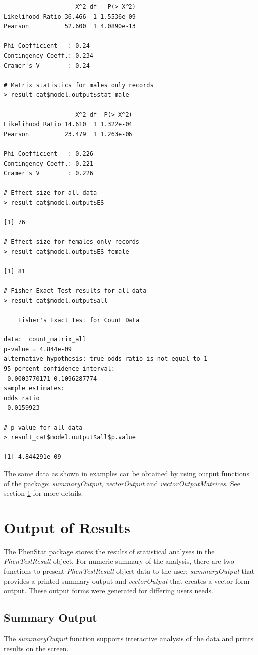 \documentclass[12pt,a4paper]{article}
\begin{document}
\begin{verbatim}
                    X^2 df   P(> X^2)
Likelihood Ratio 36.466  1 1.5536e-09
Pearson          52.600  1 4.0890e-13

Phi-Coefficient   : 0.24 
Contingency Coeff.: 0.234 
Cramer's V        : 0.24 

# Matrix statistics for males only records
> result_cat$model.output$stat_male

                    X^2 df  P(> X^2)
Likelihood Ratio 14.610  1 1.322e-04
Pearson          23.479  1 1.263e-06

Phi-Coefficient   : 0.226 
Contingency Coeff.: 0.221 
Cramer's V        : 0.226 

# Effect size for all data
> result_cat$model.output$ES

[1] 76

# Effect size for females only records
> result_cat$model.output$ES_female

[1] 81

# Fisher Exact Test results for all data
> result_cat$model.output$all

	Fisher's Exact Test for Count Data

data:  count_matrix_all 
p-value = 4.844e-09
alternative hypothesis: true odds ratio is not equal to 1 
95 percent confidence interval:
 0.0003770171 0.1096287774 
sample estimates:
odds ratio 
 0.0159923
 
# p-value for all data
> result_cat$model.output$all$p.value

[1] 4.844291e-09
\end{verbatim}
\endgroup

The same data as shown in examples can be obtained by using output functions of the package: \textit{summaryOutput}, \textit{vectorOutput} and \textit{vectorOutputMatrices}. See section \ref{section:Results} for more details.

\section{Output of Results}
\label{section:Results}
The PhenStat package stores the results of statistical analyses in the \textit{PhenTestResult} object.  
For numeric summary of the analysis, there are two functions to present \textit{PhenTestResult} object data to the user: 
\textit{summaryOutput} that provides a printed summary output and \textit{vectorOutput} that creates a vector form output. 
These output forms were generated for differing users needs. 

\subsection{Summary Output}
The \textit{summaryOutput} function supports interactive analysis of the data and prints results on the screen.
\end{document}
